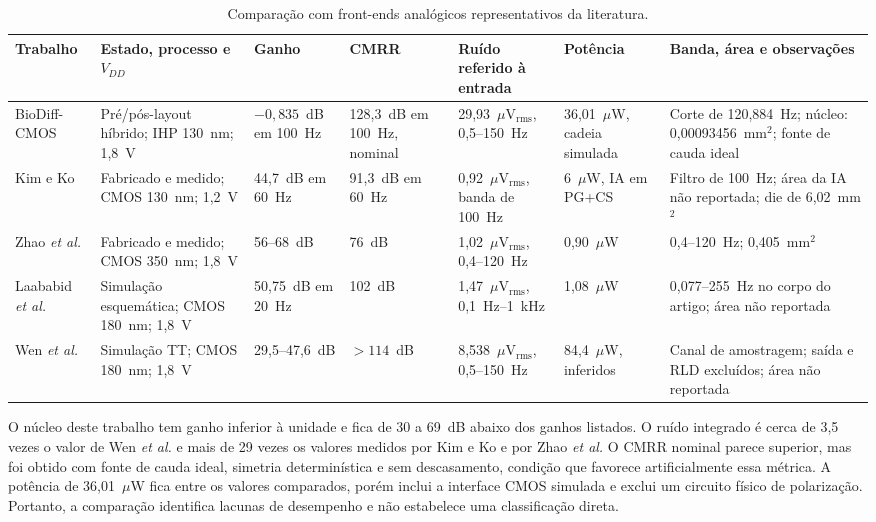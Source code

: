 \documentclass[conference]{IEEEtran}
\begin{document}
\begin{table}[t]
\caption{Comparação com front-ends analógicos representativos da literatura.}
\label{tab:literatura}
\centering
\scriptsize
\setlength{\tabcolsep}{3pt}
\begin{tabularx}{\textwidth}{p{2.25cm} p{2.65cm} p{1.7cm} p{1.45cm} p{2.35cm} p{1.55cm} Y}
\hline
Trabalho & Estado, processo e $V_{DD}$ & Ganho & CMRR & Ruído referido à entrada & Potência & Banda, área e observações \\
\hline
BioDiff-CMOS & Pré/pós-layout híbrido; IHP 130~nm; 1,8~V & $-0,835$~dB em 100~Hz & 128,3~dB em 100~Hz, nominal & 29,93~$\mu$V$_{\mathrm{rms}}$, 0,5--150~Hz & 36,01~$\mu$W, cadeia simulada & Corte de 120,884~Hz; núcleo: 0,00093456~mm$^2$; fonte de cauda ideal \\
Kim e Ko \cite{kim2016} & Fabricado e medido; CMOS 130~nm; 1,2~V & 44,7~dB em 60~Hz & 91,3~dB em 60~Hz & 0,92~$\mu$V$_{\mathrm{rms}}$, banda de 100~Hz & 6~$\mu$W, IA em PG+CS & Filtro de 100~Hz; área da IA não reportada; die de 6,02~mm$^2$ \\
Zhao \emph{et al.} \cite{zhao2019} & Fabricado e medido; CMOS 350~nm; 1,8~V & 56--68~dB & 76~dB & 1,02~$\mu$V$_{\mathrm{rms}}$, 0,4--120~Hz & 0,90~$\mu$W & 0,4--120~Hz; 0,405~mm$^2$ \\
Laababid \emph{et al.} \cite{laababid2022} & Simulação esquemática; CMOS 180~nm; 1,8~V & 50,75~dB em 20~Hz & 102~dB & 1,47~$\mu$V$_{\mathrm{rms}}$, 0,1~Hz--1~kHz & 1,08~$\mu$W & 0,077--255~Hz no corpo do artigo; área não reportada \\
Wen \emph{et al.} \cite{wen2025} & Simulação TT; CMOS 180~nm; 1,8~V & 29,5--47,6~dB & $>114$~dB & 8,538~$\mu$V$_{\mathrm{rms}}$, 0,5--150~Hz & 84,4~$\mu$W, inferidos & Canal de amostragem; saída e RLD excluídos; área não reportada \\
\hline
\end{tabularx}
\end{table}

O núcleo deste trabalho tem ganho inferior à unidade e fica de 30 a 69~dB abaixo dos ganhos listados. O ruído integrado é cerca de 3,5 vezes o valor de Wen \emph{et al.} e mais de 29 vezes os valores medidos por Kim e Ko e por Zhao \emph{et al.} O CMRR nominal parece superior, mas foi obtido com fonte de cauda ideal, simetria determinística e sem descasamento, condição que favorece artificialmente essa métrica. A potência de 36,01~$\mu$W fica entre os valores comparados, porém inclui a interface CMOS simulada e exclui um circuito físico de polarização. Portanto, a comparação identifica lacunas de desempenho e não estabelece uma classificação direta.
\end{document}
